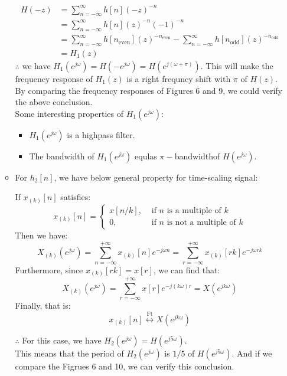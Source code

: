 \documentclass[onecolumn,oneside]{SUSTechHomework}
\begin{document}
\begin{itemize}
\begin{itemize}
$$\begin{aligned}
            H(-z)&=\sum_{n=-\infty}^{\infty} h[n](-z)^{-n}\\
            &=\sum_{n=-\infty}^{\infty} h[n](z)^{-n}(-1)^{-n}\\
            &=\sum_{n=-\infty}^{\infty} h\left[n_{\text {even}}\right](z)^{-n_{\text {even}}}-\sum_{n=-\infty}^{\infty} h\left[n_{\text {odd}}\right](z)^{-n_{\text{odd}}}
            \\ & =H_{1}(z)    
        \end{aligned}
        $$
        $\therefore$ we have $H_1(e^{j\omega})=H(-e^{j\omega})=H(e^{j(\omega+\pi)})$. This will make the frequency response of $H_1(z)$ is a right frequncy shift with $\pi$ of $H(z)$.
        \\ By comparing the frequency responses of Figures 6 and 9, we could verify the above conclusion.
        \\ Some interesting properties of $H_1(e^{j\omega})$:
        \begin{itemize}
            \item $H_1(e^{j\omega})$ is a highpass filter.
            \item The bandwidth of $H_1(e^{j\omega})$ equlas $\pi-$bandwidthof $H(e^{j\omega})$.
        \end{itemize}
        \item For $h_2[n]$, we have below general property for time-scaling signal:
        \begin{info}
        If $x_{(k)}[n]$ satisfies:
        $$
        x_{(k)}[n]=\left\{\begin{array}{ll}x[n / k], & \text { if } n \text { is a multiple of } k \\0, & \text { if } n \text { is not a multiple of } k\end{array}\right.
        $$
        Then we have:
        $$
        X_{(k)}\left(e^{j \omega}\right)=\sum_{n=-\infty}^{+\infty} x_{(k)}[n] e^{-j \omega n}=\sum_{r=-\infty}^{+\infty} x_{(k)}[r k] e^{-j \omega r k}
        $$
        Furthermore, since $x_{(k)}[r k]=x[r]$, we can find that:
        $$
        X_{(k)}\left(e^{j \omega}\right)=\sum_{r=-\infty}^{+\infty} x[r] e^{-j(k \omega) r}=X\left(e^{j k \omega}\right)
        $$
        Finally, that is:
        $$
        x_{(k)}[n] \stackrel{\mathrm{Ft}}{\longleftrightarrow} X\left(e^{j k \omega}\right)
        $$
        \end{info}
        $\therefore$ For this case, we have $H_2(e^{j\omega})=H(e^{j5\omega})$.\\
        This means that the period of $H_2(e^{j\omega})$ is $1/5$ of $H(e^{j5\omega})$. And if we
        compare the Figrues 6 and 10, we can verify this conclusion.
    \end{itemize}
\end{itemize}
\end{document}
